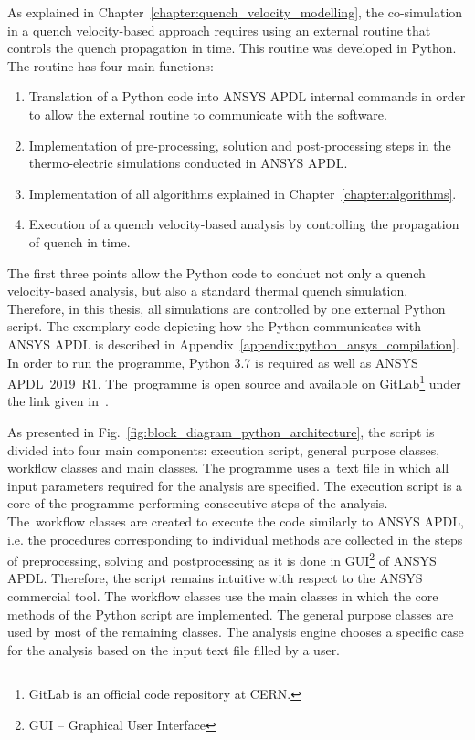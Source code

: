 
As explained in Chapter~\ref{chapter:quench_velocity_modelling}, the co-simulation in a quench velocity-based approach requires using an external routine that controls the quench propagation in time. This routine was developed in Python. The routine has four main functions: 

\begin{enumerate}
    \item Translation of a Python code into ANSYS APDL internal commands in order to allow the external routine to communicate with the software. 
    \item Implementation of pre-processing, solution and post-processing steps in the thermo-electric simulations conducted in ANSYS APDL.
    \item Implementation of all algorithms explained in Chapter~\ref{chapter:algorithms}.
    \item Execution of a quench velocity-based analysis by controlling the propagation of quench in time. 
\end{enumerate}

The first three points allow the Python code to conduct not only a quench velocity-based analysis, but also a standard thermal quench simulation. Therefore, in this thesis, all simulations are controlled by one external Python script. The exemplary code depicting how the Python communicates with ANSYS APDL is described in Appendix~\ref{appendix:python_ansys_compilation}. In order to run the programme, Python 3.7 is required as well as ANSYS APDL~2019~R1. The~programme is open source and available on GitLab\footnote{GitLab is an official code repository at CERN.} under the link given in~\cite{my_python_code}.

As presented in Fig.~\ref{fig:block_diagram_python_architecture}, the script is divided into four main components: execution script, general purpose classes, workflow classes and main classes. The programme uses a~text file in which all input parameters required for the analysis are specified. The execution script is a core of the programme performing consecutive steps of the analysis. The~workflow classes are created to execute the code similarly to ANSYS APDL, i.e. the procedures corresponding to individual methods are collected in the steps of preprocessing, solving and postprocessing as it is done in GUI\footnote{GUI -- Graphical User Interface} of ANSYS APDL. Therefore, the script remains intuitive with respect to the ANSYS commercial tool. The workflow classes use the main classes in which the core methods of the Python script are implemented. The general purpose classes are used by most of the remaining classes. The analysis engine chooses a specific case for the analysis based on the input text file filled by a user. 

